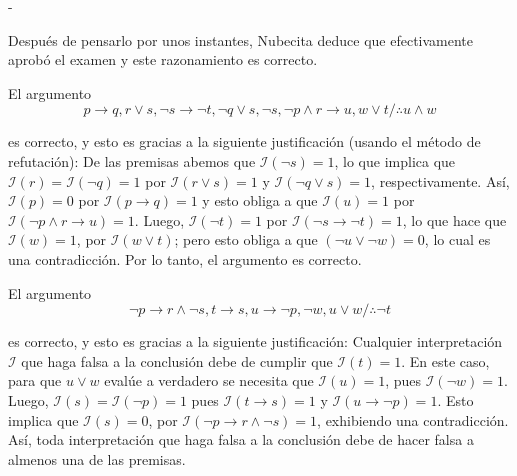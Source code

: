 \documentclass[12pt, a4paper]{exam}
\makeatletter
\renewenvironment{checkboxes}%
   {\setcounter{choice}{0}\list{\checkbox@char}%
      {%
        \settowidth{\leftmargin}{W.\hskip\labelsep\hskip 2.5em}%
        \def\choice{%
          \if@correctchoice
            \color@endgroup \endgroup
          \fi
          \stepcounter{choice}
          \item[\checked@char]
          \do@choice@pageinfo
        } %
        \def\CorrectChoice{%
          \if@correctchoice
            \color@endgroup \endgroup
          \fi
          \ifprintanswers
            \ifhmode \unskip\unskip\unvbox\voidb@x \fi
            \begingroup \color@begingroup \@correctchoicetrue
            \CorrectChoice@Emphasis
            \stepcounter{choice}
            \item[\checked@char]
          \else
            \stepcounter{choice}
            \item[\checked@char]
          \fi
          \do@choice@pageinfo
        } %
        \let\correctchoice\CorrectChoice
        \labelwidth\leftmargin\advance\labelwidth-\labelsep
        \topsep=0pt
        \partopsep=0pt
        \checkboxeshook
      }%
   }%
   {\if@correctchoice \color@endgroup \endgroup \fi \endlist}
\makeatother
\begin{document}
\begin{questions}
\begin{checkboxes}
            Después de pensarlo por unos instantes, Nubecita deduce que 
            efectivamente aprobó el examen y este razonamiento es correcto. 

            \choice El argumento 
            \begin{equation*}
                p \rightarrow q, r \lor s, \neg s \rightarrow \neg t, \neg q 
                \lor s, \neg s, \neg p \land r \rightarrow u, w \lor t / \therefore
                u \land w
            \end{equation*}

            es correcto, y esto es gracias a la siguiente justificación (usando el método de refutación): 
            De las premisas abemos que $\mathcal{I}(\neg s) 
            = 1$, lo que implica que $\mathcal{I}(r) = \mathcal{I}(\neg q) 
            = 1$ por $\mathcal{I}(r \lor s) = 1$ y $\mathcal{I}(\neg q \lor 
            s) = 1$, respectivamente. Así, $\mathcal{I}(p) = 0$ por 
            $\mathcal{I}(p \rightarrow q) = 1$ y esto obliga a que 
            $\mathcal{I}(u) = 1$ por $\mathcal{I}(\neg p \land r \rightarrow
            u) = 1$. Luego, $\mathcal{I}(\neg t) = 1$ por $\mathcal{I}(\neg s 
            \rightarrow \neg t) = 1$, lo que hace que $\mathcal{I}(w) = 1$, 
            por $\mathcal{I}(w \lor t)$; pero esto obliga a que 
            $(\neg u \lor \neg w) = 0$, lo cual es una contradicción. Por 
            lo tanto, el argumento es correcto. %

            \choice El argumento 
            \begin{equation*}
                \neg p \rightarrow r \land \neg s, t \rightarrow s, 
                u \rightarrow \neg p, \neg w, u \lor w / \therefore
                \neg t
            \end{equation*}

            es correcto, y esto es gracias a la siguiente justificación:
            Cualquier interpretación $\mathcal{I}$ que haga falsa a la 
            conclusión debe de cumplir que $\mathcal{I}(t) = 1$. En este
            caso, para que $u \lor w$ evalúe a verdadero se necesita que 
            $\mathcal{I}(u) = 1$, pues $\mathcal{I}(\neg w) = 1$. Luego, 
            $\mathcal{I}(s) = \mathcal{I}(\neg p) = 1$ pues 
            $\mathcal{I}(t \rightarrow s) = 1$ y $\mathcal{I}(u \rightarrow
            \neg p) = 1$. Esto implica que $\mathcal{I}(s) = 0$, por 
            $\mathcal{I}(\neg p \rightarrow r \land \neg s) = 1$, exhibiendo una
            contradicción. Así, toda interpretación que haga falsa a la
            conclusión debe de hacer 
            falsa a almenos una de las premisas. %


\end{checkboxes}
\end{questions}
\end{document}
